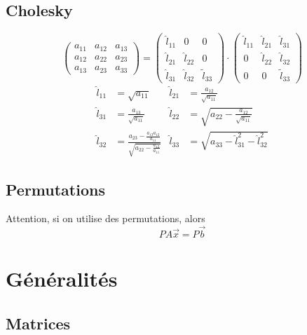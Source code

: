 \documentclass[]{article}
\begin{document}
\begin{multicols}{3}
\subsection{Cholesky}
$$\begin{pmatrix}
a_{11} & a_{12} & a_{13}\\
a_{12} & a_{22} & a_{23}\\
a_{13} & a_{23} & a_{33}
\end{pmatrix}=\begin{pmatrix}
\hat{l}_{11} & 0 & 0\\
\hat{l}_{21} & \hat{l}_{22} & 0\\
\hat{l}_{31} & \hat{l}_{32} & \tilde{l}_{33}
\end{pmatrix}\cdot\begin{pmatrix}
\hat{l}_{11} & \hat{l}_{21} & \hat{l}_{31}\\
0 & \hat{l}_{22} & \hat{l}_{32}\\
0 & 0 & \tilde{l}_{33}
\end{pmatrix}$$
\begin{align*}
\hat{l}_{11}&=\sqrt{a_{11}} & \hat{l}_{21}&=\frac{a_{12}}{\sqrt{a_{11}}}\\
\hat{l}_{31}&=\frac{a_{13}}{\sqrt{a_{11}}} & \hat{l}_{22}&=\sqrt{a_{22}-\frac{a_{12}}{\sqrt{a_{11}}}}\\
\hat{l}_{32}&=\frac{a_{23}-\frac{a_{13}a_{12}}{a_{11}}}{\sqrt{a_{22}-\frac{a_{12}}{a_{11}}}} & \hat{l}_{33}&=\sqrt{a_{33}-\hat{l}_{31}^2-\hat{l}_{32}^2}
\end{align*}
\subsection{Permutations}
Attention, si on utilise des permutations, alors
$$PA\vec{x}=P\vec{b}$$





\section{Généralités}
\subsection{Matrices}

\end{multicols}
\end{document}
